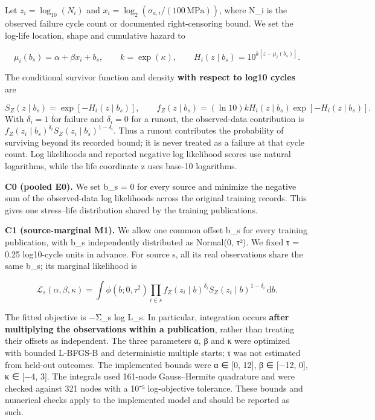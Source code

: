 \documentclass[12pt,a4paper]{article}
\begin{document}
Let \(z_i=\log_{10}(N_i)\) and \(x_i=\log_2(\sigma_{a,i}/(100\,\mathrm{MPa}))\), where N\_i is the observed failure cycle count or documented right-censoring bound. We set the log-life location, shape and cumulative hazard to

\begin{equation}
\mu_i(b_s)=\alpha+\beta x_i+b_s,\qquad k=\exp(\kappa),\qquad H_i(z\mid b_s)=10^{k[z-\mu_i(b_s)]}.
\end{equation}

The conditional survivor function and density \textbf{with respect to log10 cycles} are

\begin{equation}
S_Z(z\mid b_s)=\exp[-H_i(z\mid b_s)],\qquad
f_Z(z\mid b_s)=(\ln 10)kH_i(z\mid b_s)\exp[-H_i(z\mid b_s)].
\end{equation}
With \(\delta_i=1\) for failure and \(\delta_i=0\) for a runout, the observed-data contribution is \(f_Z(z_i\mid b_s)^{\delta_i}S_Z(z_i\mid b_s)^{1-\delta_i}\). Thus a runout contributes the probability of surviving beyond its recorded bound; it is never treated as a failure at that cycle count. Log likelihoods and reported negative log likelihood scores use natural logarithms, while the life coordinate z uses base-10 logarithms.

\textbf{C0 (pooled E0).} We set b\_s = 0 for every source and minimize the negative sum of the observed-data log likelihoods across the original training records. This gives one stress–life distribution shared by the training publications.

\textbf{C1 (source-marginal M1).} We allow one common offset b\_s for every training publication, with b\_s independently distributed as Normal(0, τ²). We fixed τ = 0.25 log10-cycle units in advance. For source s, all its real observations share the same b\_s; its marginal likelihood is

\begin{equation}
\mathcal L_s(\alpha,\beta,\kappa)=\int \phi(b;0,\tau^2)\prod_{i\in s}f_Z(z_i\mid b)^{\delta_i}S_Z(z_i\mid b)^{1-\delta_i}\,\mathrm{d}b.
\end{equation}

The fitted objective is −Σ\_s log L\_s. In particular, integration occurs \textbf{after multiplying the observations within a publication}, rather than treating their offsets as independent. The three parameters α, β and κ were optimized with bounded L-BFGS-B and deterministic multiple starts; τ was not estimated from held-out outcomes. The implemented bounds were α ∈ [0, 12], β ∈ [−12, 0], κ ∈ [−4, 3]. The integrals used 161-node Gauss–Hermite quadrature and were checked against 321 nodes with a 10⁻⁵ log-objective tolerance. These bounds and numerical checks apply to the implemented model and should be reported as such.
\end{document}
